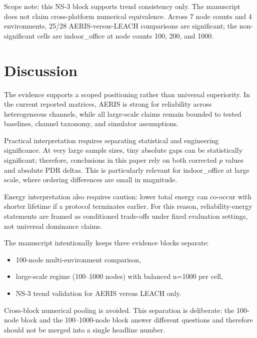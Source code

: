 \documentclass[sensors,article,submit,moreauthors,pdftex]{Definitions/mdpi}
\begin{document}
Scope note: this NS-3 block supports trend consistency only. The manuscript does not claim cross-platform numerical equivalence. Across 7 node counts and 4 environments, 25/28 AERIS-versus-LEACH comparisons are significant; the non-significant cells are indoor\_office at node counts 100, 200, and 1000.

\section{Discussion}
The evidence supports a scoped positioning rather than universal superiority. In the current reported matrices, AERIS is strong for reliability across heterogeneous channels, while all large-scale claims remain bounded to tested baselines, channel taxonomy, and simulator assumptions.

Practical interpretation requires separating statistical and engineering significance. At very large sample sizes, tiny absolute gaps can be statistically significant; therefore, conclusions in this paper rely on both corrected $p$ values and absolute PDR deltas. This is particularly relevant for indoor\_office at large scale, where ordering differences are small in magnitude.

Energy interpretation also requires caution: lower total energy can co-occur with shorter lifetime if a protocol terminates earlier. For this reason, reliability-energy statements are framed as conditioned trade-offs under fixed evaluation settings, not universal dominance claims.

The manuscript intentionally keeps three evidence blocks separate:
\begin{itemize}
\item 100-node multi-environment comparison,
\item large-scale regime (100--1000 nodes) with balanced n=1000 per cell,
\item NS-3 trend validation for AERIS versus LEACH only.
\end{itemize}
Cross-block numerical pooling is avoided. This separation is deliberate: the 100-node block and the 100--1000-node block answer different questions and therefore should not be merged into a single headline number.
\end{document}
